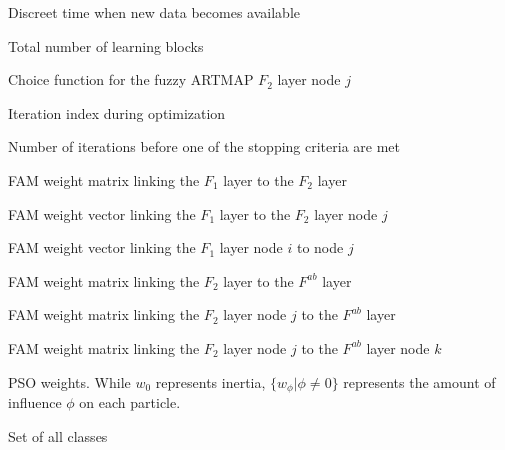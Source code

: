 \item [$t$] Discreet time when new data becomes available
\item [$T$] Total number of learning blocks
\item [$T_{j}$] Choice function for the fuzzy ARTMAP $F_2$ layer node $j$
\item [$\tau$] Iteration index during optimization
\item [$\tau*$] Number of iterations before one of the stopping criteria are met
\item [$\textbf{W}$] FAM weight matrix linking the $F_1$ layer to the $F_2$ layer
\item [$\textbf{w}_j$] FAM weight vector linking the $F_1$ layer to the $F_2$ layer node $j$
\item [$w_{ij}$] FAM weight vector linking the $F_1$ layer node $i$ to node $j$
\item [$\textbf{W}^{ab}$] FAM weight matrix linking the $F_2$ layer to the $F^{ab}$ layer
\item [$\textbf{w}^{ab}_j$] FAM weight matrix linking the $F_2$ layer node $j$ to the $F^{ab}$ layer
\item [$w^{ab}_{jk}$] FAM weight matrix linking the $F_2$ layer node $j$ to the $F^{ab}$ layer node $k$
\item [$w_{\phi}$] PSO weights. While $w_0$ represents inertia, $\{w_{\phi}|\phi \neq 0\}$ represents the amount of influence $\phi$ on each particle.
\item [$\Omega$] Set of all classes
